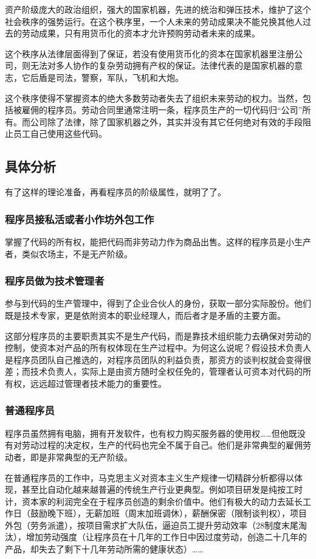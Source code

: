 \documentclass[punct=kaiming, zihao=5, openany, fontset=sikou]{ctexbook}
\begin{document}
资产阶级庞大的政治组织，强大的国家机器，先进的统治和弹压技术，维护了这个社会秩序的强势运行。在这个秩序里，一个人未来的劳动成果决不能兑换其他人过去的劳动成果，只有用货币化的资本才允许预购劳动者未来的成果。

这个秩序从法律层面得到了保证，若没有使用货币化的资本在国家机器里注册公司，则无法对多人协作的复杂劳动拥有产权的保证。法律代表的是国家机器的意志，它后盾是司法，警察，军队，飞机和大炮。

这个秩序使得不掌握资本的绝大多数劳动者失去了组织未来劳动的权力。当然，包括被雇佣的程序员。劳动合同里通常注明一条，程序员生产的一切代码归“公司”所有。而公司除了法律，除了国家机器之外，其实并没有其它任何绝对有效的手段阻止员工自己使用这些代码。

\subsection{具体分析}
有了这样的理论准备，再看程序员的阶级属性，就明了了。

\subsubsection{程序员接私活或者小作坊外包工作}
掌握了代码的所有权，能把代码而非劳动力作为商品出售。这样的程序员是小生产者，类似农场主，不是无产阶级。

\subsubsection{程序员做为技术管理者}
参与到代码的生产管理中，得到了企业合伙人的身份，获取一部分实际股份。他们既是技术专家，更是依附资本的职业经理人，而后者才是矛盾的主要方面。

这部分程序员的主要职责其实不是生产代码，而是靠技术组织能力去确保对劳动的控制，使资本对产品的所有权体现在生产过程中。为何这么说呢？假设技术负责人是程序员团队自己推选的，对程序员团队的利益负责，那资方的谈判权就会变得很差；而技术负责人，实际上是由资方随时全权任免的，管理者认可资本对代码的所有权，远远超过管理者技术能力的重要性。

\subsubsection{普通程序员}
程序员虽然拥有电脑，拥有开发软件，也有权力购买服务器的使用权……但他既没有对劳动过程的决定权，生产的代码也完全不属于自己。他们是非常典型的雇佣劳动者，即是非常典型的无产阶级。

在普通程序员的工作中，马克思主义对资本主义生产规律一切精辟分析都得以体现，甚至比自动化越来越普遍的传统生产行业更典型。例如项目研发是纯按工时计，资本家的利润完全在于程序员创造的剩余价值中。他们有极大的动力去延长工作日（鼓励晚下班），无薪加班（周末加班调休），薪酬保密（限制谈判权），项目外包（劳务派遣），按项目需求扩大队伍，逼迫员工提升劳动效率（28制度末尾淘汰），增加劳动强度（让程序员在十几年的工作日中因过度劳动，创造二十几年的产品，却失去了剩下十几年劳动所需的健康状态）……
\end{document}
